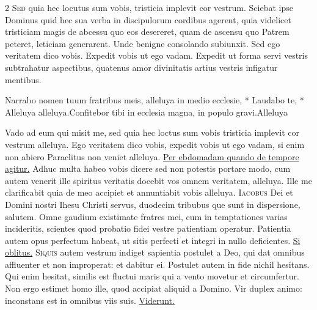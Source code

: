 \begin{multicols*}{2}
\lettrine[lines=2]{\zallmancaps \color{Red} S}{ed} quia hec locutus sum vobis, tristicia implevit cor vestrum. Sciebat ipse Dominus quid hec sua verba in discipulorum cordibus agerent, quia videlicet tristiciam magis de abcessu quo eos desereret, quam de ascensu quo Patrem peteret, leticiam generarent. Unde benigne consolando subiunxit. Sed ego veritatem dico vobis. Expedit vobis ut ego vadam. Expedit ut forma servi vestris subtrahatur aspectibus, quatenus amor divinitatis artius vestris infigatur mentibus.
\begin{responsory-final}
{Narrabo nomen tuum fratribus meis, alleluya in medio ecclesie, * Laudabo te, * Alleluya alleluya.}{Confitebor tibi in ecclesia magna, in populo gravi.}{Alleluya}
\end{responsory-final}%
 Vado ad eum qui misit me, sed quia hec loctus sum vobis tristicia implevit cor vestrum alleluya.
 Ego veritatem dico vobis, expedit vobis ut ego vadam, si enim non abiero Paraclitus non veniet alleluya.
\newline \ul{Per ebdomadam quando de tempore agitur.}
 Adhuc multa habeo vobis dicere sed non potestis portare modo, cum autem venerit ille spiritus veritatis docebit vos omnem veritatem, alleluya.
 Ille me clarificabit quia de meo accipiet et annuntiabit vobis alleluya.
\lettrine[lines=2]{\zallmancaps \color{Blue} I}{acobus} Dei et Domini nostri Ihesu Christi servus, duodecim tribubus que sunt in dispersione, salutem. Omne gaudium existimate fratres mei, cum in temptationes varias incideritis, scientes quod probatio fidei vestre patientiam operatur. Patientia autem opus perfectum habeat, ut sitis perfecti et integri in nullo deficientes. \R \hyperlink{si-oblitus}{Si oblitus.}
\lettrine[lines=2]{\zallmancaps \color{Red} S}{iquis} autem vestrum indiget sapientia postulet a Deo, qui dat omnibus affluenter et non improperat: et dabitur ei. Postulet autem in fide nichil hesitans. Qui enim hesitat, similis est fluctui maris qui a vento movetur et circumfertur. Non ergo estimet homo ille, quod accipiat aliquid a Domino. Vir duplex animo: inconstans est in omnibus viis suis. \R \hyperlink{viderunt-te}{Viderunt.}

\end{multicols*}
